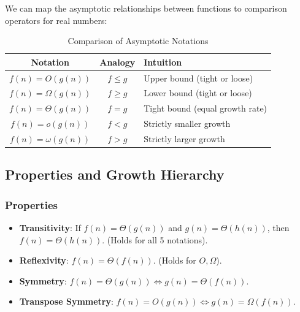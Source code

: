 \documentclass[12pt]{article}
\theoremstyle{blueplain}
\theoremstyle{bluedef}
\theoremstyle{blueremark}
\begin{document}
We can map the asymptotic relationships between functions to comparison operators for real numbers:

\begin{table}[h]
    \centering
    \begin{tabular}{|c|c|l|}
        \hline
        \textbf{Notation}     & \textbf{Analogy} & \textbf{Intuition}              \\ \hline
        $f(n) = O(g(n))$      & $f \le g$        & Upper bound (tight or loose)    \\ \hline
        $f(n) = \Omega(g(n))$ & $f \ge g$        & Lower bound (tight or loose)    \\ \hline
        $f(n) = \Theta(g(n))$ & $f = g$          & Tight bound (equal growth rate) \\ \hline
        $f(n) = o(g(n))$      & $f < g$          & Strictly smaller growth         \\ \hline
        $f(n) = \omega(g(n))$ & $f > g$          & Strictly larger growth          \\ \hline
    \end{tabular}
    \caption{Comparison of Asymptotic Notations}
\end{table}

\subsection{Properties and Growth Hierarchy}

\subsubsection{Properties}
\begin{itemize}
    \item \textbf{Transitivity}: If $f(n) = \Theta(g(n))$ and $g(n) = \Theta(h(n))$, then $f(n) = \Theta(h(n))$. (Holds for all 5 notations).
    \item \textbf{Reflexivity}: $f(n) = \Theta(f(n))$. (Holds for $O, \Omega$).
    \item \textbf{Symmetry}: $f(n) = \Theta(g(n)) \iff g(n) = \Theta(f(n))$.
    \item \textbf{Transpose Symmetry}: $f(n) = O(g(n)) \iff g(n) = \Omega(f(n))$.
\end{itemize}
\end{document}

